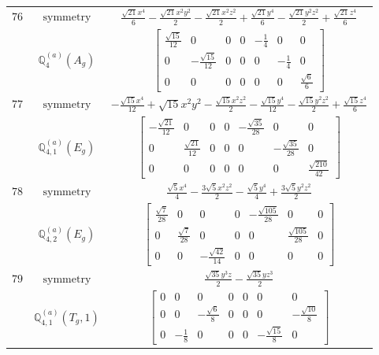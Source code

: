 \documentclass[fleqn,8pt,landscape]{jsarticle}
\begin{document}
\begin{longtable}{ccc}
$ 76 $ & $ \text{symmetry} $ & $ \frac{\sqrt{21} x^{4}}{6} - \frac{\sqrt{21} x^{2} y^{2}}{2} - \frac{\sqrt{21} x^{2} z^{2}}{2} + \frac{\sqrt{21} y^{4}}{6} - \frac{\sqrt{21} y^{2} z^{2}}{2} + \frac{\sqrt{21} z^{4}}{6} $ \\
$  $ & $ \mathbb{Q}_{4}^{(a)}(A_{g}) $ & $ \begin{bmatrix} \frac{\sqrt{15}}{12} & 0 & 0 & 0 & - \frac{1}{4} & 0 & 0 \\ 0 & - \frac{\sqrt{15}}{12} & 0 & 0 & 0 & - \frac{1}{4} & 0 \\ 0 & 0 & 0 & 0 & 0 & 0 & \frac{\sqrt{6}}{6} \end{bmatrix} $ \\ \hline
$ 77 $ & $ \text{symmetry} $ & $ - \frac{\sqrt{15} x^{4}}{12} + \sqrt{15} x^{2} y^{2} - \frac{\sqrt{15} x^{2} z^{2}}{2} - \frac{\sqrt{15} y^{4}}{12} - \frac{\sqrt{15} y^{2} z^{2}}{2} + \frac{\sqrt{15} z^{4}}{6} $ \\
$  $ & $ \mathbb{Q}_{4,1}^{(a)}(E_{g}) $ & $ \begin{bmatrix} - \frac{\sqrt{21}}{12} & 0 & 0 & 0 & - \frac{\sqrt{35}}{28} & 0 & 0 \\ 0 & \frac{\sqrt{21}}{12} & 0 & 0 & 0 & - \frac{\sqrt{35}}{28} & 0 \\ 0 & 0 & 0 & 0 & 0 & 0 & \frac{\sqrt{210}}{42} \end{bmatrix} $ \\ \hline
$ 78 $ & $ \text{symmetry} $ & $ \frac{\sqrt{5} x^{4}}{4} - \frac{3 \sqrt{5} x^{2} z^{2}}{2} - \frac{\sqrt{5} y^{4}}{4} + \frac{3 \sqrt{5} y^{2} z^{2}}{2} $ \\
$  $ & $ \mathbb{Q}_{4,2}^{(a)}(E_{g}) $ & $ \begin{bmatrix} \frac{\sqrt{7}}{28} & 0 & 0 & 0 & - \frac{\sqrt{105}}{28} & 0 & 0 \\ 0 & \frac{\sqrt{7}}{28} & 0 & 0 & 0 & \frac{\sqrt{105}}{28} & 0 \\ 0 & 0 & - \frac{\sqrt{42}}{14} & 0 & 0 & 0 & 0 \end{bmatrix} $ \\ \hline
$ 79 $ & $ \text{symmetry} $ & $ \frac{\sqrt{35} y^{3} z}{2} - \frac{\sqrt{35} y z^{3}}{2} $ \\
$  $ & $ \mathbb{Q}_{4,1}^{(a)}(T_{g},1) $ & $ \begin{bmatrix} 0 & 0 & 0 & 0 & 0 & 0 & 0 \\ 0 & 0 & - \frac{\sqrt{6}}{8} & 0 & 0 & 0 & - \frac{\sqrt{10}}{8} \\ 0 & - \frac{1}{8} & 0 & 0 & 0 & - \frac{\sqrt{15}}{8} & 0 \end{bmatrix} $ \\ \hline

\end{longtable}
\end{document}
